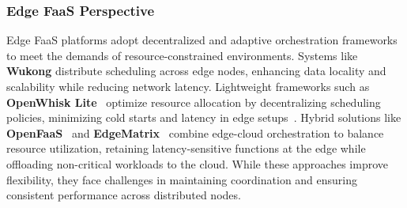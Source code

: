 \subsubsection{Edge FaaS Perspective}

Edge FaaS platforms adopt decentralized and adaptive orchestration frameworks to meet the demands of resource-constrained environments. Systems like \textbf{Wukong} distribute scheduling across edge nodes, enhancing data locality and scalability while reducing network latency. Lightweight frameworks such as \textbf{OpenWhisk Lite}~\cite{kravchenko_kpavelopenwhisk-light_2024} optimize resource allocation by decentralizing scheduling policies, minimizing cold starts and latency in edge setups~\cite{benjamin_wukong_2020}. Hybrid solutions like \textbf{OpenFaaS}~\cite{noauthor_openfaasfaas_2024} and \textbf{EdgeMatrix}~\cite{shen_edgematrix_2023} combine edge-cloud orchestration to balance resource utilization, retaining latency-sensitive functions at the edge while offloading non-critical workloads to the cloud. While these approaches improve flexibility, they face challenges in maintaining coordination and ensuring consistent performance across distributed nodes.

